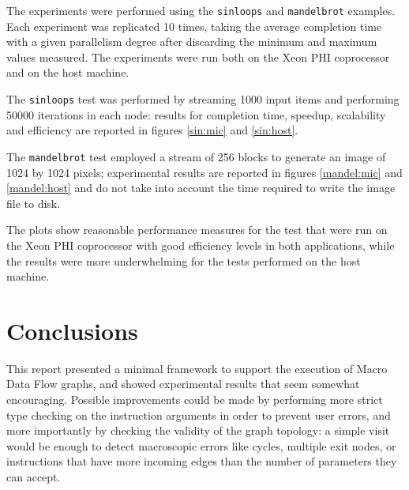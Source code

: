 \documentclass[a4paper, 11pt, oneside]{article}
\begin{document}
The experiments were performed using the \texttt{sinloops} and \texttt{mandelbrot} examples. Each experiment was replicated 10 times, taking the average completion time with a given parallelism degree after discarding the minimum and maximum values measured. The experiments were run both on the Xeon PHI coprocessor and on the host machine.

The \texttt{sinloops} test was performed by streaming 1000 input items and performing 50000 iterations in each node: results for completion time, speedup, scalability and efficiency are reported in figures \ref{sin:mic} and \ref{sin:host}.

The \texttt{mandelbrot} test employed a stream of 256 blocks to generate an image of 1024 by 1024 pixels; experimental results are reported in figures \ref{mandel:mic} and \ref{mandel:host} and do not take into account the time required to write the image file to disk.

The plots show reasonable performance measures for the test that were run on the Xeon PHI coprocessor with good efficiency levels in both applications, while the results were more underwhelming for the tests performed on the host machine.

\section {Conclusions}

This report presented a minimal framework to support the execution of Macro Data Flow graphs, and showed experimental results that seem somewhat encouraging. Possible improvements could be made by performing more strict type checking on the instruction arguments in order to prevent user errors, and more importantly by checking the validity of the graph topology: a simple visit would be enough to detect macroscopic errors like cycles, multiple exit nodes, or instructions that have more incoming edges than the number of parameters they can accept.
\end{document}
